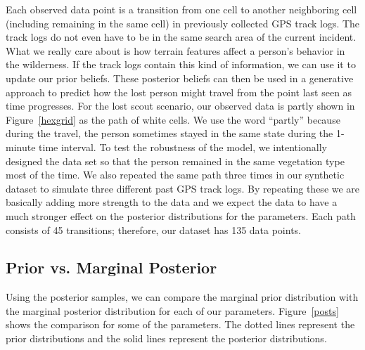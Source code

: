 Each observed data point is a transition from one cell to another neighboring cell (including remaining in the same cell) in previously collected GPS track logs. The track logs do not even have to be in the same search area of the current incident. What we really care about is how terrain features affect a person's behavior in the wilderness. If the track logs contain this kind of information, we can use it to update our prior beliefs. These posterior beliefs can then be used in a generative approach to predict how the lost person might travel from the point last seen as time progresses. For the lost scout scenario, our observed data is partly shown in Figure~\ref{hexgrid} as the path of white cells. We use the word ``partly'' because during the travel, the person sometimes stayed in the same state during the 1-minute time interval. To test the robustness of the model, we intentionally designed the data set so that the person remained in the same vegetation type most of the time. We also repeated the same path three times in our synthetic dataset to simulate three different past GPS track logs. By repeating these we are basically adding more strength to the data and we expect the data to have a much stronger effect on the posterior distributions for the parameters. Each path consists of 45 transitions; therefore, our dataset has 135 data points.




\subsection{Prior vs. Marginal Posterior}
\label{sec:4.2}

Using the posterior samples, we can compare the marginal prior distribution with the marginal posterior distribution for each of our parameters. Figure~\ref{posts} shows the comparison for some of the parameters. The dotted lines represent the prior distributions and the solid lines represent the posterior distributions.

